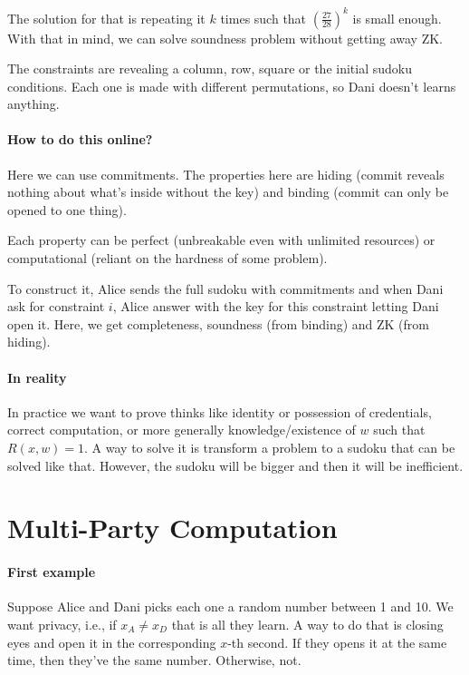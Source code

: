   The solution for that is repeating it $k$ times such that $\left(\frac{27}{28}\right)^k$ is small enough.
  With that in mind, we can solve soundness problem without getting away ZK.

  \begin{remark}
    The constraints are revealing a column, row, square or the initial sudoku conditions.
    Each one is made with different permutations, so Dani doesn't learns anything.
  \end{remark}

  \paragraph{How to do this online?}
  Here we can use commitments.
  The properties here are hiding (commit reveals nothing about what's inside without 
  the key) and binding (commit can only be opened to one thing).

  Each property can be perfect (unbreakable even with unlimited resources)
  or computational (reliant on the hardness of some problem).

  To construct it, Alice sends the full sudoku with commitments and when Dani ask for 
  constraint $i$, Alice answer with the key for this constraint letting Dani open it.
  Here, we get completeness, soundness (from binding) and ZK (from hiding).

  \paragraph{In reality}
  In practice we want to prove thinks like identity or possession of credentials,
  correct computation, or more generally knowledge/existence of $w$ such that $R(x,w)=1$.
  A way to solve it is transform a problem to a sudoku that can be solved like that.
  However, the sudoku will be bigger and then it will be inefficient.

  \section{Multi-Party Computation}
  \paragraph{First example}
  Suppose Alice and Dani picks each one a random number between 1 and 10.
  We want privacy, i.e., if $x_A \neq x_D$ that is all they learn.
  A way to do that is closing eyes and open it in the corresponding $x$-th second.
  If they opens it at the same time, then they've the same number.
  Otherwise, not.


